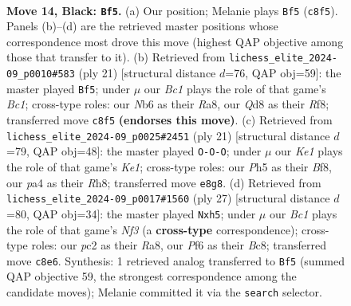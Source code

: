 \documentclass[11pt]{article}
\begin{document}
\clearpage

\begin{figure}[p]\centering
\begin{subfigure}{0.46\textwidth}\centering
\resizebox{\linewidth}{!}{%
\newchessgame
\chessboard[
  setfen={r1bqk2r/ppp1b3/nn3pp1/3p3p/P2P4/NB5N/RPP2PPP/2BQR1K1 b kq - 5 14},
  showmover=false,
  pgfstyle=straightmove, color=movearrow, markmove={c8-f5}
]}
\caption{}
\end{subfigure}\hfill
\begin{subfigure}{0.46\textwidth}\centering
\resizebox{\linewidth}{!}{%
\newchessgame
\chessboard[
  setfen={r1bq1rk1/1pp1ppbp/pn3np1/8/P2P4/1BN2N1P/1PP1QPP1/R1B2RK1 b - - 4 11},
  showmover=false,
  pgfstyle=straightmove, color=movearrow, markmove={c8-f5}
]}
\caption{}
\end{subfigure}
\\[4pt]
\begin{subfigure}{0.46\textwidth}\centering
\resizebox{\linewidth}{!}{%
\newchessgame
\chessboard[
  setfen={r3kb1r/1pp1qppp/1nn5/p3p2b/P7/1B1PBN1P/1PP2PP1/RN1QR1K1 b kq - 1 11},
  showmover=false,
  pgfstyle=straightmove, color=movearrow, markmove={e8-c8}
]}
\caption{}
\end{subfigure}\hfill
\begin{subfigure}{0.46\textwidth}\centering
\resizebox{\linewidth}{!}{%
\newchessgame
\chessboard[
  setfen={r1bqr1k1/1p2bppp/2pp1n2/p6N/Pn2P3/1BN4P/1PP2PP1/R1BQ1RK1 b - - 2 14},
  showmover=false,
  pgfstyle=straightmove, color=movearrow, markmove={f6-h5}
]}
\caption{}
\end{subfigure}
\caption{\textbf{Move 14, Black: \texttt{Bf5}.} (a) Our position; Melanie plays \texttt{Bf5} (\texttt{c8f5}). Panels (b)--(d) are the retrieved master positions whose correspondence most drove this move (highest QAP objective among those that transfer to it). (b) Retrieved from \texttt{lichess\_elite\_2024-09\_p0010\#583} (ply 21) [structural distance $d$=76, QAP obj=59]: the master played \texttt{Bf5}; under $\mu$ our \emph{Bc1} plays the role of that game's \emph{Bc1}; cross-type roles: our \emph{N}b6 as their \emph{R}a8, our \emph{Q}d8 as their \emph{R}f8; transferred move \texttt{c8f5} \textbf{(endorses this move)}. (c) Retrieved from \texttt{lichess\_elite\_2024-09\_p0025\#2451} (ply 21) [structural distance $d$=79, QAP obj=48]: the master played \texttt{O-O-O}; under $\mu$ our \emph{Ke1} plays the role of that game's \emph{Ke1}; cross-type roles: our \emph{P}h5 as their \emph{B}f8, our \emph{p}a4 as their \emph{R}h8; transferred move \texttt{e8g8}. (d) Retrieved from \texttt{lichess\_elite\_2024-09\_p0017\#1560} (ply 27) [structural distance $d$=80, QAP obj=34]: the master played \texttt{Nxh5}; under $\mu$ our \emph{Bc1} plays the role of that game's \emph{Nf3} (a \textbf{cross-type} correspondence); cross-type roles: our \emph{p}c2 as their \emph{R}a8, our \emph{P}f6 as their \emph{B}c8; transferred move \texttt{c8e6}. Synthesis: 1 retrieved analog transferred to \texttt{Bf5} (summed QAP objective 59, the strongest correspondence among the candidate moves); Melanie committed it via the \texttt{search} selector.}
\label{fig:thought-m27}
\end{figure}
\end{document}
